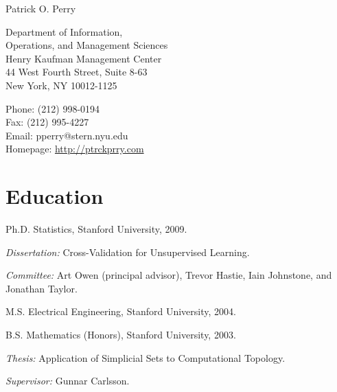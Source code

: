 \documentclass[10pt,letterpaper]{article}
\def\name{Patrick O. Perry}
\renewenvironment{itemize}{
  \begin{list}{}{
    \setlength{\leftmargin}{1.5em}
    \setlength{\itemsep}{0.25em}
    \setlength{\parskip}{0pt}
    \setlength{\parsep}{0.25em}
  }
}{
  \end{list}
}
\begin{document}
\nobibliography*

{\huge \name}


\bigskip

\begin{minipage}[t]{0.5\textwidth}
  Department of Information, \\
  Operations, and Management Sciences \\
  Henry Kaufman Management Center \\
  44 West Fourth Street, Suite 8-63 \\
  New York, NY 10012-1125
\end{minipage}
\begin{minipage}[t]{0.5\textwidth}
  Phone: (212) 998-0194 \\
  Fax: (212) 995-4227 \\
  Email: pperry@stern.nyu.edu \\
  Homepage: \href{http://ptrckprry.com/}{http://ptrckprry.com}
\end{minipage}

%

\section*{Education}

\begin{itemize}
  \item Ph.D. Statistics, Stanford University, 2009.
    \begin{itemize}
    \item \textit{Dissertation:}
      Cross-Validation for Unsupervised Learning.
    \item \textit{Committee:}
      Art Owen (principal advisor), Trevor Hastie,
      Iain Johnstone, and Jonathan Taylor.
    \end{itemize}
  \item M.S. Electrical Engineering, Stanford University, 2004.
  \item B.S. Mathematics (Honors),
    Stanford University, 2003.
    \begin{itemize}
    \item \textit{Thesis:}
      Application of Simplicial Sets to Computational Topology.
    \item \textit{Supervisor:} Gunnar Carlsson.
    \end{itemize}
\end{itemize}
\end{document}
